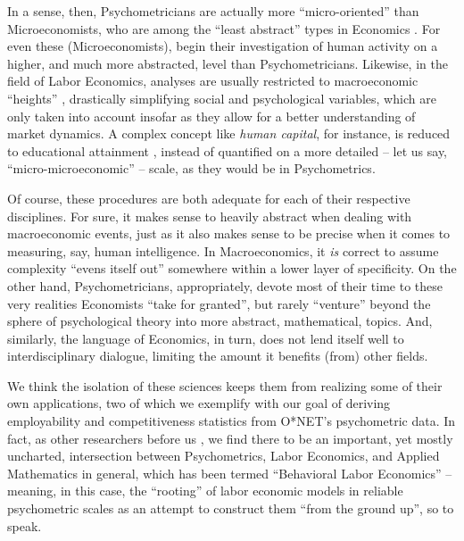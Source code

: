 \documentclass[hidelinks, nonatbib]{elsarticle}
\begin{document}
In a sense, then, Psychometricians are actually more ``micro-oriented'' than Microeconomists, who are among the ``least abstract'' types in Economics \parencite[cf.][]{jehle_reny_micro,romer_macro}. For even these (Microeconomists), begin their investigation of human activity on a higher, and much more abstracted, level than Psychometricians. Likewise, in the field of Labor Economics, analyses are usually restricted to macroeconomic ``heights'' \parencite[e.g.][]{romer_human_capital, barro_1991, nelson_phelps_1966, becker1994, becker1962, lucas_1988, uhr_et_al_2020, mulligan_sala_1995}, drastically simplifying social and psychological variables, which are only taken into account insofar as they allow for a better understanding of market dynamics. A complex concept like \textit{human capital}, for instance, is reduced to educational attainment \parencite[refer to][for a list of human capital proxies]{schütt_human_capital}, instead of quantified on a more detailed -- let us say, ``micro-microeconomic'' -- scale, as they would be in Psychometrics.

Of course, these procedures are both adequate for each of their respective disciplines. For sure, it makes sense to heavily abstract when dealing with macroeconomic events, just as it also makes sense to be precise when it comes to measuring, say, human intelligence. In Macroeconomics, it \textit{is} correct to assume complexity ``evens itself out'' somewhere within a lower layer of specificity. On the other hand, Psychometricians, appropriately, devote most of their time to these very realities Economists ``take for granted'', but rarely ``venture'' beyond the sphere of psychological theory into more abstract, mathematical, topics. And, similarly, the language of Economics, in turn, does not lend itself well to interdisciplinary dialogue, limiting the amount it benefits (from) other fields.

We think the isolation of these sciences keeps them from realizing some of their own applications, two of which we exemplify with our goal of deriving employability and competitiveness statistics from O*NET's psychometric data. In fact, as other researchers before us \parencite[see][]{tom_behavioral_labor_econ}, we find there to be an important, yet mostly uncharted, intersection between Psychometrics, Labor Economics, and Applied Mathematics in general, which has been termed ``Behavioral Labor Economics'' -- meaning, in this case, the ``rooting'' of labor economic models in reliable psychometric scales as an attempt to construct them ``from the ground up'', so to speak.
\end{document}
